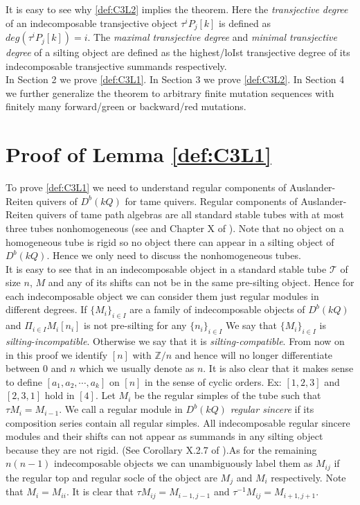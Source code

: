 \indent It is easy to see why \ref{def:C3L2} implies the theorem. Here the \textit{transjective degree} of an indecomposable transjective object $\tau^iP_j[k]$ is defined as $deg(\tau^iP_j[k])=i$. The \textit{maximal transjective degree} and \textit{minimal transjective degree} of a silting object are defined as the highest/loIst transjective degree of its indecomposable transjective summands respectively.\\
\indent In Section 2 we prove \ref{def:C3L1}. In Section 3 we prove \ref{def:C3L2}. In Section 4 we further generalize the theorem to arbitrary finite mutation sequences with finitely many forward/green or backward/red mutations.\\
\section{Proof of Lemma \ref{def:C3L1}}
\indent To prove \ref{def:C3L1} we need to understand regular components of Auslander-Reiten quivers of $D^b(kQ)$ for tame quivers. Regular components of Auslander-Reiten quivers of tame path algebras are all standard stable tubes with at most three tubes nonhomogeneous (see \cite{DR76} and Chapter X of \cite{SS06}). Note that no object on a homogeneous tube is rigid so no object there can appear in a silting object of $D^b(kQ)$. Hence we only need to discuss the nonhomogeneous tubes.\\
\indent It is easy to see that in an indecomposable object in a standard stable tube $\mathcal{T}$ of size $n$, $M$ and any of its shifts can not be in the same pre-silting object. Hence for each indecomposable object we can consider them just regular modules in different degrees. If $\{M_i\}_{i\in I}$ are a family of indecomposable objects of $D^b(kQ)$ and $\Pi_{i\in I}M_i[n_i]$ is not pre-silting for any $\{n_i\}_{i\in I}$ We say that $\{M_i\}_{i\in I}$ is \textit{silting-incompatible}. Otherwise we say that it is \textit{silting-compatible}. From now on in this proof we identify $[n]$ with $\mathbb{Z}/n$ and hence will no longer differentiate between $0$ and $n$ which we usually denote as $n$. It is also clear that it makes sense to define $[a_1, a_2,\cdots, a_k]$ on $[n]$ in the sense of cyclic orders. Ex: $[1,2,3]$ and $[2,3,1]$ hold in $[4]$. Let $M_i$ be the regular simples of the tube such that $\tau M_i=M_{i-1}$. We call a regular module in $D^b(kQ)$ \textit{regular sincere} if its composition series contain all regular simples. All indecomposable regular sincere modules and their shifts can not appear as summands in any silting object because they are not rigid. (See Corollary X.2.7 of \cite{SS06}).As for the remaining $n(n-1)$ indecomposable objects we can unambiguously label them as $M_{ij}$ if the regular top and regular socle of the object are $M_j$ and $M_i$ respectively. Note that $M_i=M_{ii}$. It is clear that $\tau M_{ij}=M_{i-1,j-1}$ and $\tau^{-1} M_{ij}=M_{i+1,j+1}$.\\

